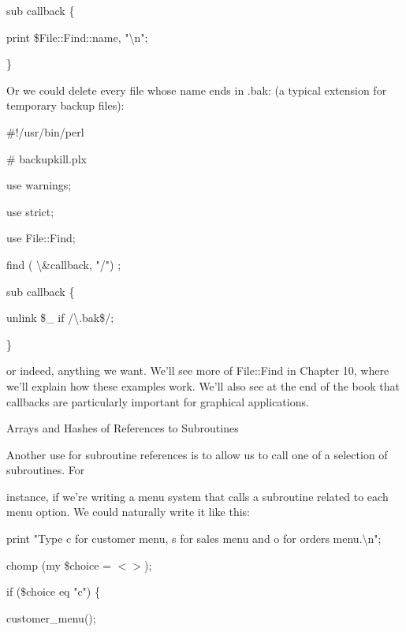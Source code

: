 \documentclass[a4paper,11pt]{book}
\begin{document}
\noindent 

\noindent sub callback \{

\noindent print \$File::Find::name, "\textbackslash n";

\noindent \}

\noindent 

\noindent Or we could delete every file  whose  name  ends  in  .bak:  (a  typical  extension  for temporary backup files):

\noindent 

\noindent 

\noindent \#!/usr/bin/perl

\noindent \# backupkill.plx

\noindent use warnings;

\noindent use strict;

\noindent use File::Find;

\noindent find ( \textbackslash \&callback, "/") ;

\noindent 

\noindent sub callback \{

\noindent unlink \$\_  if /\textbackslash .bak\$/;

\noindent \}

\noindent 

\noindent or indeed, anything we want. We'll see more of File::Find in Chapter 10, where we'll explain how these examples work. We'll also see at the end of the book that callbacks are particularly important for graphical applications.

\noindent 

\noindent 

\noindent Arrays and Hashes of References to Subroutines

\noindent 

\noindent Another use for subroutine references is to allow us to call one of a selection of subroutines. For

\noindent instance, if we're writing a menu system that calls a subroutine related to each menu option. We could naturally write it like this:

\noindent 

\noindent print "Type c for customer menu, s for sales menu and o for orders menu.\textbackslash n";

\noindent chomp (my \$choice = $<$$>$);

\noindent if (\$choice eq "c") \{

\noindent customer\_menu();
\end{document}
